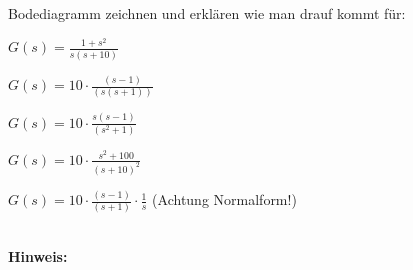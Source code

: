 \begin{question}[section=3,name={Bodediagramm},difficulty=5,type=mdl,tags={}]
	Bodediagramm zeichnen und erklären wie man drauf kommt für:
	\begin{compactenum}
		\item $G(s) = \frac{1+s^2}{s(s+10)}$
		\item $G(s) = 10 \cdot \frac{(s-1)}{(s(s+1))}$
		\item $G(s) = 10 \cdot \frac{s(s-1)}{(s^2+1)}$
		\item $G(s) = 10 \cdot \frac{s^2+100}{(s+10)^2}$
		\item $G(s) = 10 \cdot \frac{(s-1)}{(s+1)} \cdot \frac{1}{s}$ (Achtung Normalform!) 
	\end{compactenum}
	\\ \textbf{Hinweis:}\\
	
\end{question}
\begin{solution}
	
\end{solution}